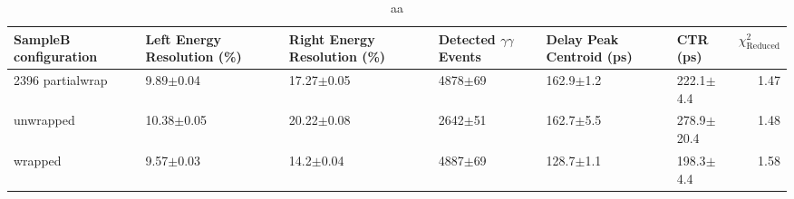 \begin{table}
\caption{aa}
\begin{tabular}{llllllr}
\hline
SampleB configuration & Left Energy Resolution (\%) & Right Energy Resolution (\%) & Detected $\gamma\gamma$ Events & Delay Peak Centroid (ps)  & CTR (ps) &  $\chi^2_\text{Reduced}$ \\
\hline
2396    partialwrap   &        9.89$\pm$0.04 &   17.27$\pm$0.05 &  4878$\pm$69 &  162.9$\pm$1.2 &   222.1$\pm$4.4 &        1.47 \\
        unwrapped     &       10.38$\pm$0.05 &   20.22$\pm$0.08 &  2642$\pm$51 &  162.7$\pm$5.5 &  278.9$\pm$20.4 &        1.48 \\
        wrapped       &        9.57$\pm$0.03 &    14.2$\pm$0.04 &  4887$\pm$69 &  128.7$\pm$1.1 &   198.3$\pm$4.4 &        1.58 \\
\hline
\end{tabular}
\end{table}